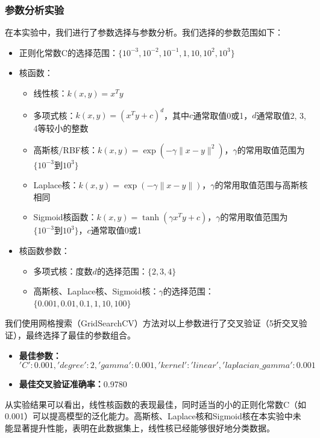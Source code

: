 \documentclass[12pt]{article}
\begin{document}
\subsubsection{参数分析实验}

在本实验中，我们进行了参数选择与参数分析。我们选择的参数范围如下：

\begin{itemize}
  \item 正则化常数C的选择范围：\(\{10^{-3}, 10^{-2}, 10^{-1}, 1, 10, 10^2, 10^3\}\)
  \item 核函数：
        \begin{itemize}
          \item 线性核：\(k(x,y) = x^T y\)
          \item 多项式核：\(k(x,y) = (x^T y + c)^d\)，其中\(c\)通常取值0或1，\(d\)通常取值2, 3, 4等较小的整数
          \item 高斯核/RBF核：\(k(x,y) = \exp(-\gamma \|x - y\|^2)\)，\(\gamma\)的常用取值范围为\(\{10^{-3}到10^3\}\)
          \item Laplace核：\(k(x,y) = \exp(-\gamma \|x - y\|)\)，\(\gamma\)的常用取值范围与高斯核相同
          \item Sigmoid核函数：\(k(x,y) = \tanh(\gamma x^T y + c)\)，\(\gamma\)的常用取值范围为\(\{10^{-3}到10^3\}\)，\(c\)通常取值0或1
        \end{itemize}
  \item 核函数参数：
        \begin{itemize}
          \item 多项式核：度数\(d\)的选择范围：\(\{2, 3, 4\}\)
          \item 高斯核、Laplace核、Sigmoid核：\(\gamma\)的选择范围：\(\{0.001, 0.01, 0.1, 1, 10, 100\}\)
        \end{itemize}
\end{itemize}

我们使用网格搜索（GridSearchCV）方法对以上参数进行了交叉验证（5折交叉验证），最终选择了最佳的参数组合。

\begin{itemize}
  \item \textbf{最佳参数：}\['C': 0.001, 'degree': 2, 'gamma': 0.001, 'kernel': 'linear', 'laplacian\_gamma': 0.001\]
  \item \textbf{最佳交叉验证准确率：}0.9780
\end{itemize}

从实验结果可以看出，线性核函数的表现最佳，同时适当的小的正则化常数C（如0.001）可以提高模型的泛化能力。高斯核、Laplace核和Sigmoid核在本实验中未能显著提升性能，表明在此数据集上，线性核已经能够很好地分类数据。
\end{document}
